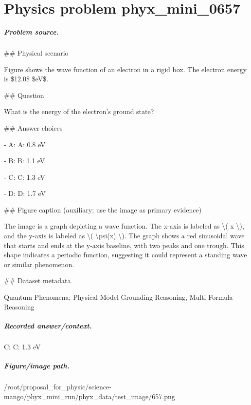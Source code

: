 
\chapter{Physics problem phyx\_mini\_0657}
\label{ch:PhyXMiniProblems_problem_phyx_mini_0657}

\paragraph{Problem source.}
\#\# Physical scenario

Figure shows the wave function of an electron in a rigid box. The electron energy is \$12.0\$ \$eV\$.

\#\# Question

What is the energy of the electron's ground state?

\#\# Answer choices

- A: A: 0.8 eV

- B: B: 1.1 eV

- C: C: 1.3 eV

- D: D: 1.7 eV

\#\# Figure caption (auxiliary; use the image as primary evidence)

The image is a graph depicting a wave function. The x-axis is labeled as \textbackslash{}( x \textbackslash{}), and the y-axis is labeled as \textbackslash{}( \textbackslash{}psi(x) \textbackslash{}). The graph shows a red sinusoidal wave that starts and ends at the y-axis baseline, with two peaks and one trough. This shape indicates a periodic function, suggesting it could represent a standing wave or similar phenomenon.

\#\# Dataset metadata

Quantum Phenomena; Physical Model Grounding Reasoning, Multi-Formula Reasoning

\paragraph{Recorded answer/context.}
C: C: 1.3 eV

\paragraph{Figure/image path.}
/root/proposal\_for\_physic/science-mango/phyx\_mini\_run/phyx\_data/test\_image/657.png

